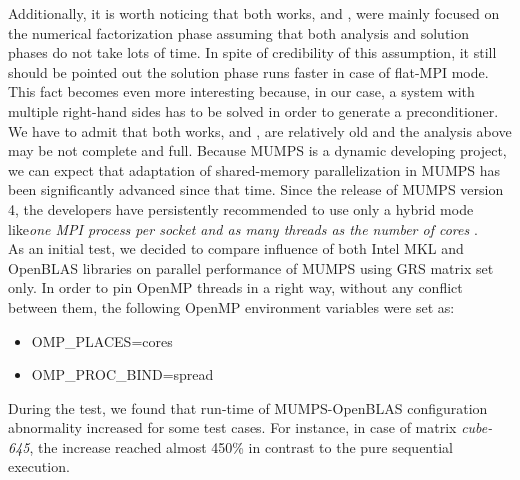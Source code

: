 Additionally, it is worth noticing that both works, \cite{chowdhury2010some} and \cite{l2013introduction}, were mainly focused on the numerical factorization phase assuming that both analysis and solution phases do not take lots of time. In spite of credibility of this assumption, it still should be pointed out the solution phase runs faster in case of flat-MPI mode. This fact becomes even more interesting because, in our case, a system with multiple right-hand sides has to be solved in order to generate a preconditioner.\\


We have to admit that both works, \cite{chowdhury2010some} and \cite{l2013introduction}, are relatively old and the analysis above may be not complete and full. Because MUMPS is a dynamic developing project, we can expect that adaptation of shared-memory parallelization in MUMPS has been significantly advanced since that time. Since the release of MUMPS version 4, the developers have persistently recommended to use only a hybrid mode like\textit{one MPI process per socket and as many threads as the number of cores} \cite{mumps-manual}.\\


As an initial test, we decided to compare influence of both Intel MKL and OpenBLAS libraries on parallel performance of MUMPS using GRS matrix set only. In order to pin OpenMP threads in a right way, without any conflict between them, the following OpenMP environment variables were set as:

\begin{itemize}
	\item OMP\_PLACES=cores
	\item OMP\_PROC\_BIND=spread
\end{itemize} 


During the test, we found that run-time of MUMPS-OpenBLAS configuration abnormality increased for some test cases. For instance, in case of matrix \textit{cube-645}, the increase reached almost 450\% in contrast to the pure sequential execution. \\

